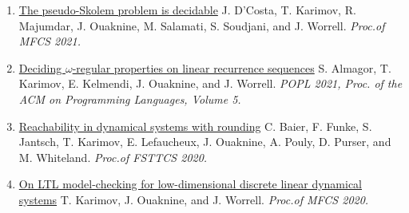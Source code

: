 \documentclass{article}
\begin{document}
\begin{enumerate}
		\item \href{https://drops.dagstuhl.de/entities/document/10.4230/LIPIcs.MFCS.2021.34}{\large The pseudo-Skolem problem is decidable}
            \vspace{0.2cm}\newline
            J. D'Costa, T. Karimov, R. Majumdar, J. Ouaknine, M. Salamati, S. Soudjani, and J. Worrell.
		\vspace*{0.2cm}\newline \emph{Proc.\@ of MFCS 2021.}
            \vspace*{0.2cm}
		
		\item 
            \href{https://dl.acm.org/doi/10.2145/3434329}{\large Deciding $\omega$-regular properties on linear recurrence sequences}
            \vspace{0.2cm}\newline
            S. Almagor, T. Karimov, E. Kelmendi, J. Ouaknine, and J. Worrell.
            \vspace*{0.2cm}\newline
		\emph{POPL 2021, Proc. of the ACM on Programming Languages, Volume 5.}
            \vspace*{0.2cm}
		
		\item 
            \href{https://drops.dagstuhl.de/entities/document/10.4230/LIPIcs.FSTTCS.2020.36}{\large Reachability in dynamical systems with rounding} 
            \vspace{0.2cm}
            \newline
            C. Baier, F. Funke, S. Jantsch, T. Karimov, E. Lefaucheux, J. Ouaknine,
		A. Pouly, D. Purser, and M. Whiteland. 
            \vspace*{0.2cm}\newline                 
            \emph{Proc.\@ of FSTTCS 2020.}
            \vspace*{0.2cm}
		
		\item 
            \href{https://drops.dagstuhl.de/entities/document/10.4230/LIPIcs.MFCS.2020.54}{\large On LTL model-checking for low-dimensional discrete linear dynamical systems}
            \vspace{0.2cm}\newline       
            T. Karimov, J. Ouaknine, and J. Worrell. 
		\vspace*{0.2cm}\newline \emph{Proc.\@ of MFCS 2020.}
	\end{enumerate}
\end{document}
